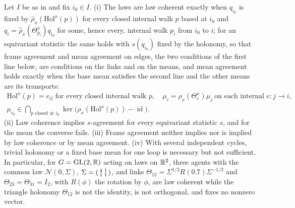 Let $I$ be as in  and fix $i_0\in I$. (i) The laws are law coherent
exactly when $q_{i_0}$ is fixed by $\widehat\rho_x(\mathrm{Hol}^x(p))$ for every closed internal walk
$p$ based at $i_0$ and $q_i=\widehat\rho_x(\Theta^x_{p_i})q_{i_0}$ for some, hence every, internal walk
$p_i$ from $i_0$ to $i$; for an equivariant statistic the same holds with $s(q_{i_0})$ fixed by the
holonomy, so that frame agreement and mean agreement on edges, the two conditions of the first line
below, are conditions on the links and on the means, and mean agreement holds exactly when the base
mean satisfies the second line and the other means are its transports:
\begin{gather}
\mathrm{Hol}^x(p)=e_G\ \text{for every closed internal walk }p,
\quad
\mu_i=\rho_x(\Theta_e^x)\mu_j\ \text{on each internal }e:j\to i,
\label{eq:phil-two-agreements}\\
\mu_{i_0}\in\bigcap_{p\text{ closed at }i_0}\ker\bigl(\rho_x(\mathrm{Hol}^x(p))-\operatorname{id}\bigr).
\label{eq:phil-agreement-kernel}
\end{gather}
(ii) Law coherence implies $s$-agreement for every equivariant statistic $s$, and for the mean the converse fails. (iii) Frame agreement neither implies
nor is implied by law coherence or by mean agreement. (iv) With several independent cycles, trivial
holonomy or a fixed base mean for one loop is necessary but not sufficient. In particular, for
$G=\mathrm{GL}(2,\mathbb R)$ acting on laws on $\mathbb R^2$, three agents with the common law $\mathcal N(0,\Sigma)$,
$\Sigma=\begin{psmallmatrix}4&1\\1&1\end{psmallmatrix}$, and links
$\Theta_{12}=\Sigma^{1/2}R(0.7)\Sigma^{-1/2}$ and $\Theta_{23}=\Theta_{31}=I_2$, with $R(\phi)$ the
rotation by $\phi$, are law coherent while the triangle holonomy $\Theta_{12}$ is not the identity, is
not orthogonal, and fixes no nonzero vector. 

